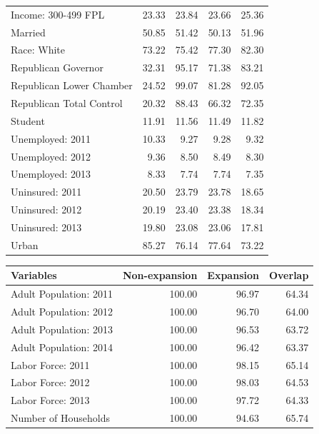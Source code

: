 \documentclass[12pt]{article}
\begin{document}
\begin{table}[ht]
\begin{tabular}{lrrrr}
  Income: 300-499 FPL & 23.33 & 23.84 & 23.66 & 25.36 \\ 
  Married & 50.85 & 51.42 & 50.13 & 51.96 \\ 
  Race: White & 73.22 & 75.42 & 77.30 & 82.30 \\ 
  Republican Governor & 32.31 & 95.17 & 71.38 & 83.21 \\ 
  Republican Lower Chamber & 24.52 & 99.07 & 81.28 & 92.05 \\ 
  Republican Total Control & 20.32 & 88.43 & 66.32 & 72.35 \\ 
  Student & 11.91 & 11.56 & 11.49 & 11.82 \\ 
  Unemployed: 2011 & 10.33 & 9.27 & 9.28 & 9.32 \\ 
  Unemployed: 2012 & 9.36 & 8.50 & 8.49 & 8.30 \\ 
  Unemployed: 2013 & 8.33 & 7.74 & 7.74 & 7.35 \\ 
  Uninsured: 2011 & 20.50 & 23.79 & 23.78 & 18.65 \\ 
  Uninsured: 2012 & 20.19 & 23.40 & 23.38 & 18.34 \\ 
  Uninsured: 2013 & 19.80 & 23.08 & 23.06 & 17.81 \\ 
  Urban & 85.27 & 76.14 & 77.64 & 73.22 \\ 
   \hline
\end{tabular}
\label{fullbaltab}
\end{table}

\begin{table}[ht]
\centering
\begin{tabular}{lrrr}
  \hline
Variables & Non-expansion & Expansion & Overlap \\ 
  \hline
Adult Population: 2011 & 100.00 & 96.97 & 64.34 \\ 
  Adult Population: 2012 & 100.00 & 96.70 & 64.00 \\ 
  Adult Population: 2013 & 100.00 & 96.53 & 63.72 \\ 
  Adult Population: 2014 & 100.00 & 96.42 & 63.37 \\ 
  Labor Force: 2011 & 100.00 & 98.15 & 65.14 \\ 
  Labor Force: 2012 & 100.00 & 98.03 & 64.53 \\ 
  Labor Force: 2013 & 100.00 & 97.72 & 64.33 \\ 
  Number of Households & 100.00 & 94.63 & 65.74 \\ 
   \hline
\end{tabular}
\end{table}
\end{document}
